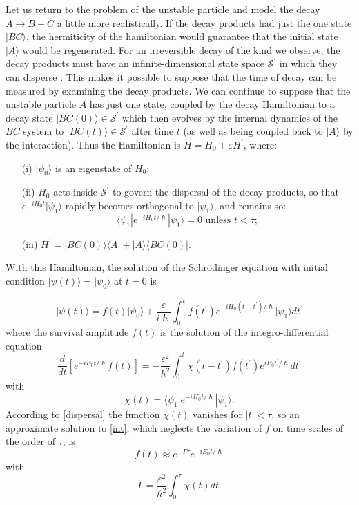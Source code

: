 \documentclass[12pt,a4paper,reqno]{article}
\renewcommand{\(}{\left(}
\renewcommand{\)}{\right)}
\renewcommand{\hbar}{\hslash}
\renewcommand{\S}{\mathcal{S}}
\newcommand{\<}{\langle}
\renewcommand{\>}{\rangle}
\theoremstyle{plain} %
\theoremstyle{definition}
\theoremstyle{remark}
\begin{document}
 Let us return to the problem of the unstable particle and model the
decay  $A\rightarrow B+C$ a little more realistically. If the decay
products  had just the one state $|BC\>$, the hermiticity of the
hamiltonian  would guarantee that the initial state $|A\>$ would be
regenerated.  For an irreversible decay of the kind we observe, the
decay products  must have an infinite-dimensional state space
$\S^\prime$ in which they can disperse \cite{rapid-dispersal}. This
makes it possible to suppose that the time of decay can be measured by
examining the decay products.  We can continue to suppose that the
unstable particle $A$ has just one  state, coupled by the decay
Hamiltonian to a decay state $|BC(0)\>\in \S^\prime$  which then evolves
by the internal dynamics of the $BC$ system to $|BC(t)\>\in \S^\prime$
after time $t$ (as well as being coupled back to $|A\>$ by the 
interaction). Thus the Hamiltonian is $H = H_0 + \varepsilon H^\prime$,
where:

\begin{enumerate}
\item[(i)] $|\psi_0\>$ is an eigenstate of $H_0$;

\item[(ii)] $H_0$ acts inside $\S^\prime$ to govern the dispersal of
the decay products, so that $e^{-iH_0t}|\psi_1\>$ rapidly becomes
orthogonal to $|\psi_1\>$, and remains so:
\begin{equation}\label{dispersal} 
\<\psi_1|e^{-iH_0t/\hbar}|\psi_1\> = 0 \text{  unless  } t < \tau;
\end{equation}

\item[(iii)] $H^\prime = |BC(0)\>\<A| + |A\>\<BC(0)|$.

\end{enumerate}

With this Hamiltonian, the solution of the Schr\"odinger equation with
initial condition $|\psi(t)\> = |\psi_0\>$ at $t=0$ is \cite{obsdecay}

\begin{equation}\label{decay2}
|\psi(t)\> = f(t)|\psi_0\> + \frac{\varepsilon}{i\hbar}\int_0^t
f(t^\prime)e^{-iH_0(t-t^\prime)/\hbar}|\psi_1\>dt^\prime
\end{equation}
where the survival amplitude $f(t)$ is the solution of the
integro-differential equation
\begin{equation}\label{int}
\frac{d}{dt}\left[e^{-iE_0t/\hbar}f(t)\right] =
-\frac{\varepsilon^2}{\hbar^2}
\int_0^t\chi(t-t^\prime)f(t^\prime)e^{iE_0t^\prime/\hbar}dt^\prime 
\end{equation}
with
\[
\chi(t) = \<\psi_1|e^{-iH_0t/\hbar}|\psi_1\>.
\]
According to \eqref{dispersal} the function $\chi(t)$ vanishes for
$|t|<\tau$, so an approximate solution to \eqref{int}, which neglects
the variation of $f$ on time scales of the order of $\tau$, is
\[
f(t) \approx e^{-\Gamma\tau}e^{-iE_0t/\hbar}
\]
with 
\[
\Gamma = \frac{\varepsilon^2}{\hbar^2}\int_0^\tau\chi(t)dt.
\]
\end{document}

